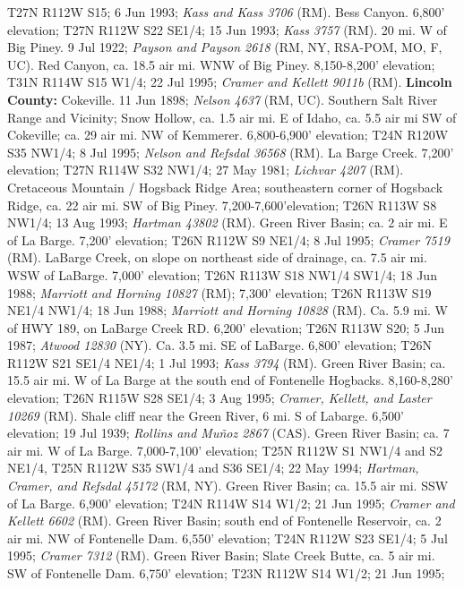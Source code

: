T27N R112W S15; 6 Jun 1993; \textit{Kass and Kass 3706} (RM).
Bess Canyon. 6,800’ elevation; T27N R112W S22 SE1/4; 15 Jun 1993;
\textit{Kass 3757} (RM).
20 mi. W of Big Piney. 9 Jul 1922;
\textit{Payson and Payson 2618} (RM, NY, RSA-POM, MO, F, UC).
Red Canyon, ca. 18.5 air mi. WNW of Big Piney. 8,150-8,200’ elevation;
T31N R114W S15 W1/4; 22 Jul 1995; \textit{Cramer and Kellett 9011b} (RM).
  \textbf{Lincoln County:}
Cokeville. 11 Jun 1898; \textit{Nelson 4637} (RM, UC).
Southern Salt River Range and Vicinity; Snow Hollow, ca. 1.5 air mi. E of Idaho,
ca. 5.5 air mi SW of Cokeville; ca. 29 air mi. NW of Kemmerer.
6,800-6,900' elevation; T24N R120W S35 NW1/4; 8 Jul 1995;
\textit{Nelson and Refsdal 36568} (RM).
La Barge Creek. 7,200' elevation; T27N R114W S32	NW1/4; 27 May 1981;
\textit{Lichvar 4207} (RM).
Cretaceous Mountain / Hogsback Ridge Area; southeastern corner of Hogsback
Ridge, ca. 22 air mi. SW of Big Piney. 7,200-7,600'elevation; T26N R113W S8
NW1/4; 13 Aug 1993; \textit{Hartman 43802} (RM).
Green River Basin; ca. 2 air mi. E of La Barge. 7,200' elevation;
T26N R112W S9 NE1/4; 8 Jul 1995; \textit{Cramer 7519} (RM).
LaBarge Creek, on slope on northeast side of drainage, ca. 7.5 air mi.
WSW of LaBarge. 7,000’ elevation; T26N R113W S18 NW1/4 SW1/4; 18 Jun 1988;
\textit{Marriott and Horning 10827} (RM);
7,300’ elevation; T26N R113W S19 NE1/4 NW1/4; 18 Jun 1988;
\textit{Marriott and Horning 10828} (RM).
Ca. 5.9 mi. W of HWY 189, on LaBarge Creek RD. 6,200' elevation;
T26N R113W S20; 5 Jun 1987; \textit{Atwood 12830} (NY).
Ca. 3.5 mi. SE of LaBarge. 6,800' elevation; T26N R112W S21 SE1/4 NE1/4;
1 Jul 1993; \textit{Kass 3794} (RM).
Green River Basin; ca. 15.5 air mi. W of La Barge at the south end of
Fontenelle Hogbacks. 8,160-8,280' elevation; T26N R115W S28	SE1/4; 3 Aug 1995;
\textit{Cramer, Kellett, and Laster 10269} (RM).
Shale cliff near the Green River, 6 mi. S of Labarge. 6,500' elevation;
19 Jul 1939; \textit{Rollins and Muñoz 2867} (CAS).
Green River Basin; ca. 7 air mi. W of La Barge. 7,000-7,100' elevation;
T25N R112W S1 NW1/4 and S2 NE1/4, T25N R112W S35 SW1/4 and S36 SE1/4;
22 May 1994; \textit{Hartman, Cramer, and Refsdal 45172} (RM, NY).
Green River Basin; ca. 15.5 air mi. SSW of La Barge. 6,900' elevation;
T24N R114W S14 W1/2; 21 Jun 1995; \textit{Cramer and Kellett 6602} (RM).
Green River Basin; south end of Fontenelle Reservoir, ca. 2 air mi. NW of
Fontenelle Dam. 6,550' elevation; T24N R112W S23 SE1/4; 5 Jul 1995;
\textit{Cramer 7312} (RM).
Green River Basin; Slate Creek Butte, ca. 5 air mi. SW of Fontenelle Dam.
6,750' elevation; T23N R112W S14 W1/2; 21 Jun 1995;

